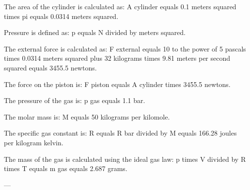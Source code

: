 The area of the cylinder is calculated as:  
A cylinder equals 0.1 meters squared times pi equals 0.0314 meters squared.  

Pressure is defined as:  
p equals N divided by meters squared.  

The external force is calculated as:  
F external equals 10 to the power of 5 pascals times 0.0314 meters squared plus 32 kilograms times 9.81 meters per second squared equals 3455.5 newtons.  

The force on the piston is:  
F piston equals A cylinder times 3455.5 newtons.  

The pressure of the gas is:  
p gas equals 1.1 bar.  

The molar mass is:  
M equals 50 kilograms per kilomole.  

The specific gas constant is:  
R equals R bar divided by M equals 166.28 joules per kilogram kelvin.  

The mass of the gas is calculated using the ideal gas law:  
p times V divided by R times T equals m gas equals 2.687 grams.  

---